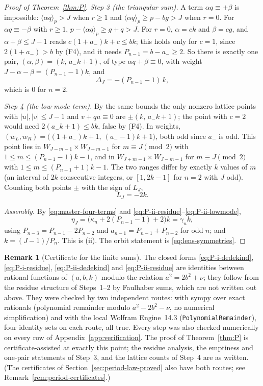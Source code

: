 \documentclass[11pt]{article}
\theoremstyle{definition}
\newtheorem{remark}[theorem]{Remark}
\begin{document}
\begin{proof}[Proof of Theorem~\ref{thm:P}]
\emph{Step 3 (the triangular sum).}  A term $\alpha q\equiv+\beta$ is
impossible: $\langle\alpha q\rangle_p>J$ when $r\geq1$ and
$\langle\alpha q\rangle_p\geq p-bg>J$ when $r=0$.  For
$\alpha q\equiv-\beta$ with $r\geq1$, $p-\langle\alpha q\rangle_p\geq g+q>J$.
For $r=0$, $\alpha=ck$ and $\beta=cg$, and $\alpha+\beta\leq J-1$ reads
$c(1+a_-)k+c\leq bk$; this holds only for $c=1$, since $2(1+a_-)>b$ by
(F4), and it needs $P_{n-1}=b-a_-\geq2$.  So there is exactly one pair,
$(\alpha,\beta)=(k,\,a_-k+1)$, of type $\alpha q+\beta\equiv0$, with
weight $J-\alpha-\beta=(P_{n-1}-1)k$, and
\begin{equation}
 \Delta_J=-(P_{n-1}-1)\,k ,
 \label{eq:P-ii-delta}
\end{equation}
which is $0$ for $n=2$.

\emph{Step 4 (the low-mode term).}  By the same bounds the only nonzero
lattice points with $|u|,|v|\leq J-1$ and $v+qu\equiv0$ are
$\pm(k,\,a_-k+1)$; the point with $c=2$ would need $2(a_-k+1)\leq bk$,
false by (F4).  In weights,
$(w_L,w_R)=\bigl((1+a_-)k+1,\ (a_--1)k+1\bigr)$, both odd since $a_-$ is
odd.  This point lies in $W_{J-m-1}\times W_{J+m-1}$ for
$m\equiv J\pmod2$ with $1\leq m\leq(P_{n-1}-1)k-1$, and in
$W_{J+m-1}\times W_{J-m-1}$ for $m\equiv J\pmod2$ with
$1\leq m\leq(P_{n-1}+1)k-1$.  The two ranges differ by exactly $k$ values
of $m$ (an interval of $2k$ consecutive integers, or $[1,2k-1]$ for
$n=2$ with $J$ odd).  Counting both points $\pm$ with the sign of $L_J$,
\begin{equation}
 L_J=-2k .
 \label{eq:P-ii-lowmode}
\end{equation}

\emph{Assembly.}  By \eqref{eq:master-four-terms} and
\eqref{eq:P-ii-residue}--\eqref{eq:P-ii-lowmode},
\[
 \eta_J=\bigl(\kappa_n+2(P_{n-1}-1)+2\bigr)k=\gamma_nk ,
\]
using $P_{n-3}=P_{n-1}-2P_{n-2}$ and $a_{n-1}=P_{n-1}+P_{n-2}$ for odd
$n$; and $k=(J-1)/P_n$.  This is (ii).  The orbit statement is
\eqref{eq:lens-symmetries}.
\end{proof}

\begin{remark}[Certificate for the finite sums]
\label{rem:faulhaber-certificate}
The closed forms \eqref{eq:P-i-dedekind}, \eqref{eq:P-i-residue},
\eqref{eq:P-ii-dedekind} and \eqref{eq:P-ii-residue} are identities
between rational functions of $(a,b,k)$ modulo the relation
$a^2=2b^2+\nu$; they follow from the residue structure of Steps~1--2 by
Faulhaber sums, which are not written out above.  They were checked by
two independent routes: with sympy over exact rationals (polynomial
remainder modulo $a^2-2b^2-\nu$, no numerical simplification) and with
the local Wolfram Engine~14.3 (\texttt{PolynomialRemainder}), four
identity sets on each route, all true.  Every step was also checked
numerically on every row of Appendix~\ref{app:verification}.  The proof
of Theorem~\ref{thm:P} is certificate-assisted at exactly this point;
the residue analysis, the emptiness and one-pair statements of Step~3,
and the lattice counts of Step~4 are as written.  (The certificates of
Section~\ref{sec:period-law-proved} also have both routes; see
Remark~\ref{rem:period-certificates}.)
\end{remark}
\end{document}
